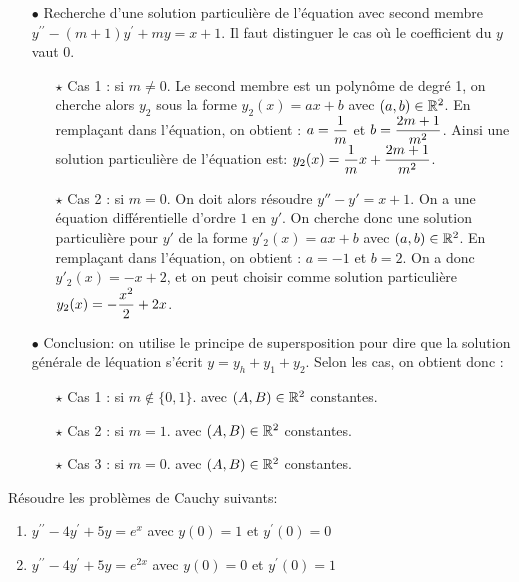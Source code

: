 \documentclass[a4paper, 11pt,reqno]{article}
\begin{document}
\begin{correction}
\begin{itemize}
\begin{itemize}
\end{itemize}
\item[$\bullet$] Recherche d'une solution particuli\`{e}re de l'\'equation avec second membre $y^{\prime\prime}-(m+1)y^{\prime}+my=x+1$. Il faut distinguer le cas o\`u le coefficient du $y$ vaut $0$.
\begin{itemize}
\item[$\star$] Cas 1 : si $m\not=0$. Le second membre est un polyn\^ome de degr\'e 1, on cherche alors $y_2$ sous la forme $y_2(x)=ax+b$ avec $(a,b)\in\mathbb{R}^2$. En rempla\c cant dans l'\'equation, on obtient : $a=\displaystyle \frac{1}{m}$ et $b=\displaystyle \frac{2m+1}{m^2}$.  Ainsi une solution particuli\`{e}re de l'\'equation est: $y_2(x)= \displaystyle\frac{1}{m} x + \frac{2m+1}{m^2}$.
\item[$\star$] Cas 2 : si $m=0$. On doit alors r\'esoudre $y''-y'=x+1$. On a une \'equation diff\'erentielle d'ordre $1$ en $y'$. On cherche donc une solution particuli\`ere pour $y'$ de la forme $y'_2(x) = ax+b$  avec $(a,b)\in\mathbb{R}^2$. En rempla\c cant dans l'\'equation, on obtient : $a=-1$ et $b=2$. On a donc $y'_2(x) = -x+2$, et on peut choisir comme solution particuli\`ere $y_2(x) = -\displaystyle\frac{x^2}{2}+2x$.
\end{itemize}
\item[$\bullet$] Conclusion: on utilise le principe de supersposition pour dire que la solution g\'en\'erale de l\'equation s'\'ecrit $y=y_h + y_1 + y_2$. Selon les cas, on obtient donc :
\begin{itemize}
\item[$\star$] Cas 1 : si $m\not\in \{0,1\}$.   avec $(A,B)\in\mathbb{R}^2$ constantes.
\item[$\star$] Cas 2 : si $m=1$.  avec $(A,B)\in\mathbb{R}^2$ constantes.
\item[$\star$] Cas 3 : si $m=0$.  avec $(A,B)\in\mathbb{R}^2$ constantes.
\end{itemize}
\end{itemize}

\end{correction}
\begin{exercice}  \;
R\'esoudre les probl\`emes de Cauchy suivants:
\begin{enumerate}
 \item $y^{\prime\prime}-4y^{\prime}+5y=e^x$ avec $y(0)=1$ et $y^{\prime}(0)=0$
\item $y^{\prime\prime}-4y^{\prime}+5y=e^{2x}$ avec $y(0)=0$ et $y^{\prime}(0)=1$
\end{enumerate}
\end{exercice}
\end{document}

